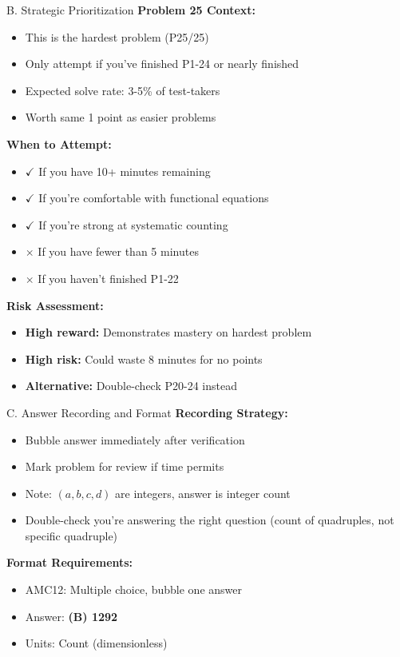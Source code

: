 \documentclass[12pt]{article}
\begin{document}
\begin{competitionbox}{B. Strategic Prioritization}
\textbf{Problem 25 Context:}
\begin{itemize}
    \item This is the hardest problem (P25/25)
    \item Only attempt if you've finished P1-24 or nearly finished
    \item Expected solve rate: 3-5\% of test-takers
    \item Worth same 1 point as easier problems
\end{itemize}

\textbf{When to Attempt:}
\begin{itemize}
    \item $\checkmark$ If you have 10+ minutes remaining
    \item $\checkmark$ If you're comfortable with functional equations
    \item $\checkmark$ If you're strong at systematic counting
    \item $\times$ If you have fewer than 5 minutes
    \item $\times$ If you haven't finished P1-22
\end{itemize}

\textbf{Risk Assessment:}
\begin{itemize}
    \item \textbf{High reward:} Demonstrates mastery on hardest problem
    \item \textbf{High risk:} Could waste 8 minutes for no points
    \item \textbf{Alternative:} Double-check P20-24 instead
\end{itemize}
\end{competitionbox}

\begin{competitionbox}{C. Answer Recording and Format}
\textbf{Recording Strategy:}
\begin{itemize}
    \item Bubble answer immediately after verification
    \item Mark problem for review if time permits
    \item Note: $(a,b,c,d)$ are integers, answer is integer count
    \item Double-check you're answering the right question (count of quadruples, not specific quadruple)
\end{itemize}

\textbf{Format Requirements:}
\begin{itemize}
    \item AMC12: Multiple choice, bubble one answer
    \item Answer: \textbf{(B) 1292}
    \item Units: Count (dimensionless)
\end{itemize}
\end{competitionbox}
\end{document}
